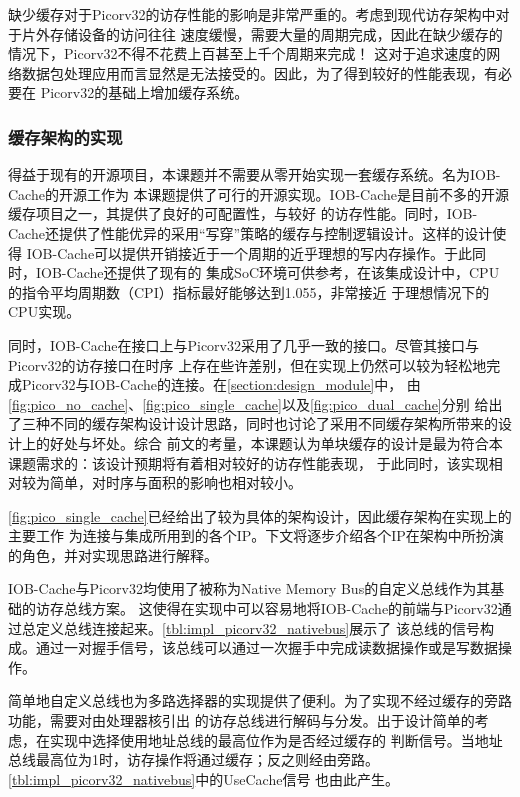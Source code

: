 缺少缓存对于Picorv32的访存性能的影响是非常严重的。考虑到现代访存架构中对于片外存储设备的访问往往
速度缓慢，需要大量的周期完成，因此在缺少缓存的情况下，Picorv32不得不花费上百甚至上千个周期来完成！
这对于追求速度的网络数据包处理应用而言显然是无法接受的。因此，为了得到较好的性能表现，有必要在
Picorv32的基础上增加缓存系统。

\subsubsection{缓存架构的实现}

得益于现有的开源项目，本课题并不需要从零开始实现一套缓存系统。名为IOB-Cache的开源工作\cite{roque2021iob}为
本课题提供了可行的开源实现。IOB-Cache是目前不多的开源缓存项目之一，其提供了良好的可配置性，与较好
的访存性能。同时，IOB-Cache还提供了性能优异的采用“写穿”策略的缓存与控制逻辑设计。这样的设计使得
IOB-Cache可以提供开销接近于一个周期的近乎理想的写内存操作。于此同时，IOB-Cache还提供了现有的
集成SoC环境可供参考，在该集成设计中，CPU的指令平均周期数（CPI）指标最好能够达到1.055，非常接近
于理想情况下的CPU实现。

同时，IOB-Cache在接口上与Picorv32采用了几乎一致的接口。尽管其接口与Picorv32的访存接口在时序
上存在些许差别，但在实现上仍然可以较为轻松地完成Picorv32与IOB-Cache的连接。在\autoref{section:design_module}中，
由\autoref{fig:pico_no_cache}、\autoref{fig:pico_single_cache}以及\autoref{fig:pico_dual_cache}分别
给出了三种不同的缓存架构设计设计思路，同时也讨论了采用不同缓存架构所带来的设计上的好处与坏处。综合
前文的考量，本课题认为单块缓存的设计是最为符合本课题需求的：该设计预期将有着相对较好的访存性能表现，
于此同时，该实现相对较为简单，对时序与面积的影响也相对较小。

\autoref{fig:pico_single_cache}已经给出了较为具体的架构设计，因此缓存架构在实现上的主要工作
为连接与集成所用到的各个IP。下文将逐步介绍各个IP在架构中所扮演的角色，并对实现思路进行解释。

IOB-Cache与Picorv32均使用了被称为Native Memory Bus的自定义总线作为其基础的访存总线方案。
这使得在实现中可以容易地将IOB-Cache的前端与Picorv32通过总定义总线连接起来。\autoref{tbl:impl_picorv32_nativebus}展示了
该总线的信号构成。通过一对握手信号，该总线可以通过一次握手中完成读数据操作或是写数据操作。

简单地自定义总线也为多路选择器的实现提供了便利。为了实现不经过缓存的旁路功能，需要对由处理器核引出
的访存总线进行解码与分发。出于设计简单的考虑，在实现中选择使用地址总线的最高位作为是否经过缓存的
判断信号。当地址总线最高位为1时，访存操作将通过缓存；反之则经由旁路。\autoref{tbl:impl_picorv32_nativebus}中的UseCache信号
也由此产生。

